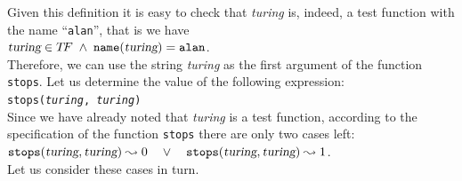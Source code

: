 Given this definition it is easy to check that \textsl{turing} is, indeed, a test function with the name
``\texttt{alan}'', that is we have 
\\[0.3cm]
\hspace*{1.3cm} 
$\textsl{turing} \in T\!F \;\wedge\; \mathtt{name}(\textsl{turing}) = \mathtt{alan}$. 
\\[0.2cm]
Therefore, we can use the string \textsl{turing} as the first argument of the function
\texttt{stops}.  Let us determine the value of the following expression:
\\[0.2cm]
\hspace*{1.3cm} 
\texttt{stops(\textsl{turing}, \textsl{turing})} 
\\[0.2cm]
Since we have already noted that \textsl{turing} is a test function, according to the specification of
the function \texttt{stops} there are only two cases left:
\\[0.2cm]
\hspace*{1.3cm} 
$\mathtt{stops}(\textsl{turing}, \textsl{turing}) \leadsto 0 \quad \vee\quad
 \mathtt{stops}(\textsl{turing}, \textsl{turing}) \leadsto 1$. 
\\[0.2cm]
Let us consider these cases in turn.
